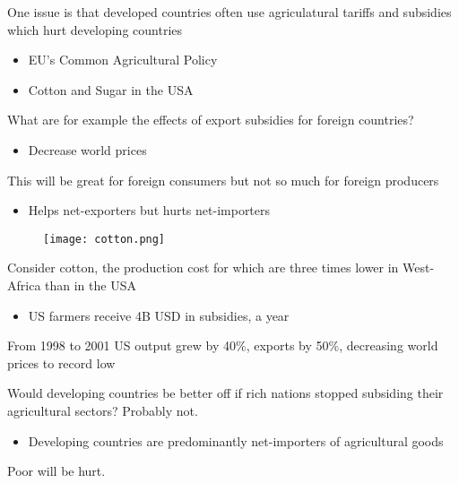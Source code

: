 \documentclass{beamer}
\begin{document}
\begin{frame}
 One issue is that developed countries often use agriculatural tariffs and subsidies which hurt developing countries
 \begin{itemize}
   \item EU's Common Agricultural Policy
   \item Cotton and Sugar in the USA
 \end{itemize}
\end{frame}

\begin{frame}
 What are for example the effects of export subsidies for foreign countries?
 \begin{itemize}
   \item Decrease world prices
 \end{itemize}
 \medskip
 This will be great for foreign consumers but not so much for foreign producers
 \begin{itemize}
   \item Helps net-exporters but hurts net-importers
 \end{itemize}
\end{frame}

\begin{frame}
  \begin{figure}
    \texttt{[image: cotton.png]}
  \end{figure}
\end{frame}

\begin{frame}
 Consider cotton, the production cost for which are three times lower in West-Africa than in the USA
 \begin{itemize}
   \item US farmers receive 4B USD in subsidies, a year
 \end{itemize}
 \medskip
 From 1998 to 2001 US output grew by 40\%, exports by 50\%, decreasing world prices to record low
\end{frame}

\begin{frame}
 Would developing countries be better off if rich nations stopped subsiding their agricultural sectors?
 Probably not.
 \begin{itemize}
   \item Developing countries are predominantly net-importers of agricultural goods   
 \end{itemize}
 \medskip
 Poor will be hurt. 
\end{frame}
\end{document}
